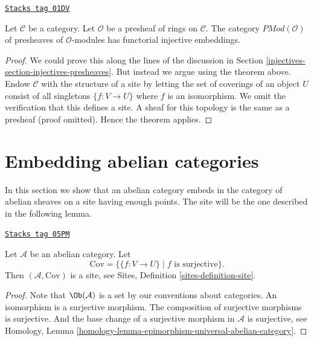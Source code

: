 \begin{proposition}
\label{injectives-proposition-presheaves-modules}
\href{https://stacks.math.columbia.edu/tag/01DV}{\texttt{Stacks tag 01DV}}

Let $\mathcal{C}$ be a category.
Let $\mathcal{O}$ be a presheaf of rings on $\mathcal{C}$.
The category $\textit{PMod}(\mathcal{O})$ of presheaves of
$\mathcal{O}$-modules has functorial injective embeddings.
\end{proposition}

\begin{proof}
We could prove this along the lines of the discussion in
Section \ref{injectives-section-injectives-presheaves}. But instead we argue using the
theorem above. Endow $\mathcal{C}$ with the structure of a site by letting the
set of coverings of an object $U$ consist of all singletons $\{f : V \to U\}$
where $f$ is an isomorphism. We omit the verification that this defines a site.
A sheaf for this topology is the same as a presheaf (proof omitted). Hence the
theorem applies.
\end{proof}

\section{Embedding abelian categories}
\label{injectives-section-embedding}
In this section we show that an abelian category embeds in the
category of abelian sheaves on a site having enough points.
The site will be the one described in the following lemma.

\begin{lemma}
\label{injectives-lemma-site-abelian-category}
\href{https://stacks.math.columbia.edu/tag/05PM}{\texttt{Stacks tag 05PM}}

Let $\mathcal{A}$ be an abelian category.
Let
$$
\text{Cov} = \{\{f : V \to U\} \mid f\text{ is surjective}\}.
$$
Then $(\mathcal{A}, \text{Cov})$ is a site, see
Sites, Definition \ref{sites-definition-site}.
\end{lemma}

\begin{proof}
Note that $\Ob(\mathcal{A})$ is a set by our conventions
about categories. An isomorphism is a surjective morphism.
The composition of surjective morphisms is surjective.
And the base change of a surjective morphism in $\mathcal{A}$
is surjective, see
Homology, Lemma \ref{homology-lemma-epimorphism-universal-abelian-category}.
\end{proof}

